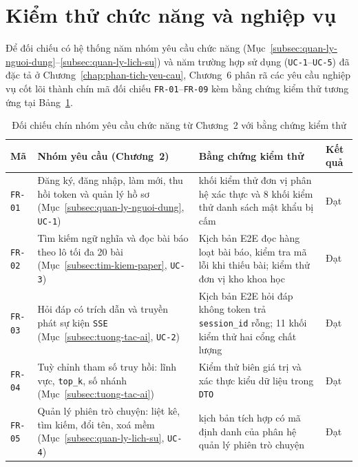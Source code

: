 \section{Kiểm thử chức năng và nghiệp vụ}
\label{sec:kiem-thu-chuc-nang}

Để đối chiếu có hệ thống năm nhóm yêu cầu chức năng (Mục~\ref{subsec:quan-ly-nguoi-dung}--\ref{subsec:quan-ly-lich-su}) và năm trường hợp sử dụng (\texttt{UC-1}--\texttt{UC-5}) đã đặc tả ở Chương~\ref{chap:phan-tich-yeu-cau}, Chương~6 phân rã các yêu cầu nghiệp vụ cốt lõi thành chín mã đối chiếu \texttt{FR-01}--\texttt{FR-09} kèm bằng chứng kiểm thử tương ứng tại Bảng~\ref{tab:doi-chieu-chuc-nang}.

\begin{table}[htbp]
\centering
\caption{Đối chiếu chín nhóm yêu cầu chức năng từ Chương~2 với bằng chứng kiểm thử}
\label{tab:doi-chieu-chuc-nang}
\small
\begin{tabularx}{\textwidth}{
  >{\raggedright\arraybackslash}p{1.6cm}
  >{\raggedright\arraybackslash}p{4.5cm}
  >{\raggedright\arraybackslash}X
  >{\raggedright\arraybackslash}p{1.6cm}
}
\toprule
\textbf{Mã} & \textbf{Nhóm yêu cầu (Chương~2)} & \textbf{Bằng chứng kiểm thử} & \textbf{Kết quả} \\
\midrule
\texttt{FR-01} & Đăng ký, đăng nhập, làm mới, thu hồi token và quản lý hồ sơ (Mục~\ref{subsec:quan-ly-nguoi-dung}, \texttt{UC-1}) & 26 khối kiểm thử đơn vị phân hệ xác thực và 8 khối kiểm thử danh sách mật khẩu bị cấm & Đạt \\
\midrule
\texttt{FR-02} & Tìm kiếm ngữ nghĩa và đọc bài báo theo lô tối đa 20 bài (Mục~\ref{subsec:tim-kiem-paper}, \texttt{UC-3}) & Kịch bản E2E đọc hàng loạt bài báo, kiểm tra mã lỗi khi thiếu bài; kiểm thử đơn vị kho khoa học & Đạt \\
\midrule
\texttt{FR-03} & Hỏi đáp có trích dẫn và truyền phát sự kiện \texttt{SSE} (Mục~\ref{subsec:tuong-tac-ai}, \texttt{UC-2}) & Kịch bản E2E hỏi đáp không token trả \texttt{session\_id} rỗng; 11 khối kiểm thử hai cổng chất lượng & Đạt \\
\midrule
\texttt{FR-04} & Tuỳ chỉnh tham số truy hồi: lĩnh vực, \texttt{top\_k}, số nhánh (Mục~\ref{subsec:tuong-tac-ai}) & Kiểm thử biên giá trị và xác thực kiểu dữ liệu trong \texttt{DTO} & Đạt \\
\midrule
\texttt{FR-05} & Quản lý phiên trò chuyện: liệt kê, tìm kiếm, đổi tên, xoá mềm (Mục~\ref{subsec:quan-ly-lich-su}, \texttt{UC-4}) & 34 kịch bản tích hợp có mã định danh của phân hệ quản lý phiên trò chuyện & Đạt \\

\end{tabularx}
\end{table}

